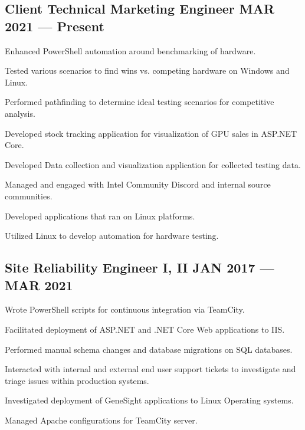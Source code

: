 \subsection{{Client Technical Marketing Engineer \hfill MAR 2021 --- Present}}
\begin{zitemize}
\item Enhanced PowerShell automation around benchmarking of hardware.
\item Tested various scenarios to find wins vs. competing hardware on Windows and Linux.
\item Performed pathfinding to determine ideal testing scenarios for competitive analysis.
\item Developed stock tracking application for visualization of GPU sales in ASP.NET Core.
\item Developed Data collection and visualization application for collected testing data.
\item Managed and engaged with Intel Community Discord and internal source communities.
\item Developed applications that ran on Linux platforms.
\item Utilized Linux to develop automation for hardware testing.
\end{zitemize}

\subsection{{Site Reliability Engineer I, II \hfill JAN 2017 --- MAR 2021}}
\begin{zitemize}
\item Wrote PowerShell scripts for continuous integration via TeamCity.
\item Facilitated deployment of ASP.NET and .NET Core Web applications to IIS.
\item Performed manual schema changes and database migrations on SQL databases.
\item Interacted with internal and external end user support tickets to investigate and triage issues within production systems.
\item Investigated deployment of GeneSight applications to Linux Operating systems.
\item Managed Apache configurations for TeamCity server.
\end{zitemize}

